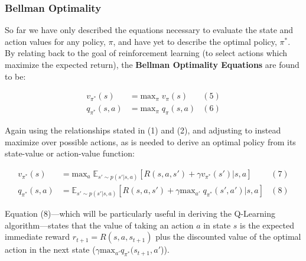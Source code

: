 \documentclass{article}
\begin{document}
\subsubsection{Bellman Optimality}

So far we have only described the equations necessary to evaluate the state and action values for any policy, $\pi$, and have yet to describe the optimal policy, $\pi^*$. By relating back to the goal of reinforcement learning (to select actions which maximize the expected return), the \textbf{Bellman Optimality Equations} are found to be:

\vspace{-5mm}\begin{center}
    \begin{align*}
        v_{\pi^*}(s) &= \text{max}_{\pi}\;v_{\pi}(s) & (5) \\
        q_{\pi^*}(s,a) &= \text{max}_{\pi}\;q_{\pi}(s,a) & (6)
    \end{align*}
\end{center}

Again using the relationships stated in (1) and (2), and adjusting to instead maximize over possible actions, as is needed to derive an optimal policy from its state-value or action-value function:

\vspace{-5mm}\begin{center}
    \begin{align*}
        v_{\pi^*}(s) &= \text{max}_{a}\;\mathbb{E}_{s'\sim p(s'|s,a)}[R(s,a,s')+\gamma v_{\pi^*}(s')|s,a] & (7) \\
        q_{\pi^*}(s,a) &= \mathbb{E}_{s'\sim p(s'|s,a)}[R(s,a,s')+\gamma\text{max}_{a'}\; q_{\pi^*}(s',a')|s,a] & (8)
    \end{align*}
\end{center}

Equation (8)---which will be particularly useful in deriving the Q-Learning algorithm---states that the value of taking an action $a$ in state $s$ is the expected immediate reward $r_{t+1}=R(s,a,s_{t+1})$ plus the discounted value of the optimal action in the next state ($\gamma\text{max}_{a'}q_{\pi^*}(s_{t+1},a'$)).
\end{document}
